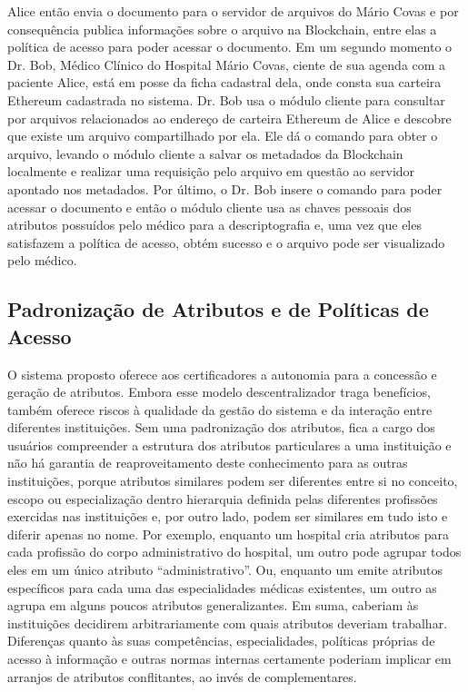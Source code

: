 \documentclass[a4paper,11pt]{article}
\begin{document}
Alice então envia o documento para o servidor de arquivos do Mário Covas e por consequência publica informações sobre o arquivo na Blockchain, entre elas a política de acesso para poder acessar o documento.
Em um segundo momento o Dr. Bob, Médico Clínico do Hospital Mário Covas, ciente de sua agenda com a paciente Alice, está em posse da ficha cadastral dela, onde consta sua carteira Ethereum cadastrada no sistema.
Dr. Bob usa o módulo cliente para consultar por arquivos relacionados ao endereço de carteira Ethereum de Alice e descobre que existe um arquivo compartilhado por ela.
Ele dá o comando para obter o arquivo, levando o módulo cliente a salvar os metadados da Blockchain localmente e realizar uma requisição pelo arquivo em questão ao servidor apontado nos metadados. %
Por último, o Dr. Bob insere o comando para poder acessar o documento e então o módulo cliente usa as chaves pessoais dos atributos possuídos pelo médico para a descriptografia e, uma vez que eles satisfazem a política de acesso, obtém sucesso e o arquivo pode ser visualizado pelo médico.

\subsection{Padronização de Atributos e de Políticas de Acesso}
\label{sec:sub:padronizacao-permissoes}

O sistema proposto oferece aos certificadores a autonomia para a concessão e geração de atributos.
Embora esse modelo descentralizador traga benefícios, também oferece riscos à qualidade da gestão do sistema e da interação entre diferentes instituições.
Sem uma padronização dos atributos, fica a cargo dos usuários compreender a estrutura dos atributos particulares a uma instituição e não há garantia de reaproveitamento deste conhecimento para as outras instituições, porque atributos similares podem ser diferentes entre si no conceito, escopo ou especialização dentro hierarquia definida pelas diferentes profissões exercidas nas instituições e, por outro lado, podem ser similares em tudo isto e diferir apenas no nome.
Por exemplo, enquanto um hospital cria atributos para cada profissão do corpo administrativo do hospital, um outro pode agrupar todos eles em um único atributo ``administrativo''.
Ou, enquanto um emite atributos específicos para cada uma das especialidades médicas existentes, um outro as agrupa em alguns poucos atributos generalizantes.
Em suma, caberiam às instituições decidirem arbitrariamente com quais atributos deveriam trabalhar.
Diferenças quanto às suas competências, especialidades, políticas próprias de acesso à informação e outras normas internas certamente poderiam implicar em arranjos de atributos conflitantes, ao invés de complementares.
\end{document}
